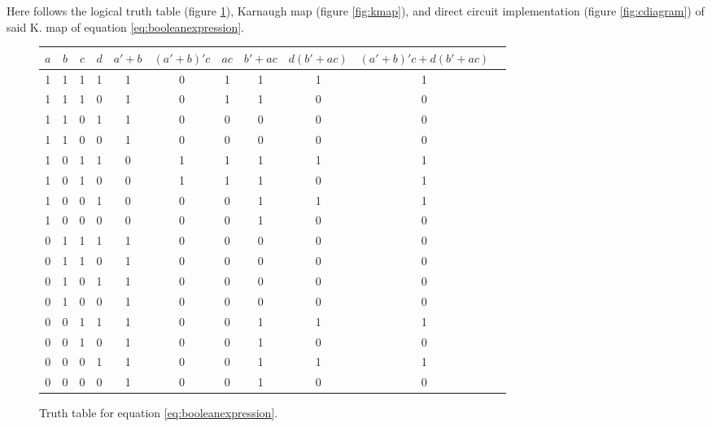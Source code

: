 \documentclass[11pt]{article}
\begin{document}
\begin{question}

	Here follows the logical truth table (figure \ref{fig:ttable}), Karnaugh map (figure \ref{fig:kmap}), and direct circuit
	implementation (figure \ref{fig:cdiagram}) of said K. map of equation \ref{eq:booleanexpression}.

	\begin{figure}[h]
		\begin{center}
			\begin{tabular} {c c c c | c c c c c c c}
				$a$ & $b$ & $c$ & $d$ & $a'+b$ & $(a'+b)'c$ & $ac$ & $b'+ac$ & $d(b'+ac)$ & $(a'+b)'c+d(b'+ac)$ \\
				\hline
				1 & 1 & 1 & 1 & 1 & 0 & 1 & 1 & 1 & 1 \\
				1 & 1 & 1 & 0 & 1 & 0 & 1 & 1 & 0 & 0 \\
				1 & 1 & 0 & 1 & 1 & 0 & 0 & 0 & 0 & 0 \\
				1 & 1 & 0 & 0 & 1 & 0 & 0 & 0 & 0 & 0 \\
				1 & 0 & 1 & 1 & 0 & 1 & 1 & 1 & 1 & 1 \\
				1 & 0 & 1 & 0 & 0 & 1 & 1 & 1 & 0 & 1 \\
				1 & 0 & 0 & 1 & 0 & 0 & 0 & 1 & 1 & 1 \\
				1 & 0 & 0 & 0 & 0 & 0 & 0 & 1 & 0 & 0 \\
				0 & 1 & 1 & 1 & 1 & 0 & 0 & 0 & 0 & 0 \\
				0 & 1 & 1 & 0 & 1 & 0 & 0 & 0 & 0 & 0 \\
				0 & 1 & 0 & 1 & 1 & 0 & 0 & 0 & 0 & 0 \\
				0 & 1 & 0 & 0 & 1 & 0 & 0 & 0 & 0 & 0 \\
				0 & 0 & 1 & 1 & 1 & 0 & 0 & 1 & 1 & 1 \\
				0 & 0 & 1 & 0 & 1 & 0 & 0 & 1 & 0 & 0 \\
				0 & 0 & 0 & 1 & 1 & 0 & 0 & 1 & 1 & 1 \\
				0 & 0 & 0 & 0 & 1 & 0 & 0 & 1 & 0 & 0 \\
			\end{tabular}
		\end{center}
		\caption{
			\label{fig:ttable}
			Truth table for equation \ref{eq:booleanexpression}.
		}
	\end{figure}

	\begin{figure}[h]
		\begin{center}
\end{center}
\end{figure}
\end{question}
\end{document}
